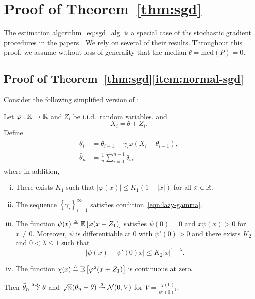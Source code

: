 \section{Proof of Theorem~\ref{thm:sgd}}
\label{proof:sgd}

\providecommand{\score}{\dot{\ell}}

The estimation algorithm~\eqref{eq:sgd_alg} is a special
case of the stochastic gradient procedures in the papers
\cite{PolyakJu92, polyak1990new}.
We rely on several of their results. Throughout this proof,
we assume without loss of generality that the median
$\theta = \mbox{med}(P) = 0$.

\subsection{Proof of Theorem~\ref{thm:sgd}\eqref{item:normal-sgd}}

Consider the following simplified version of
\cite[Thm. 4]{polyak1992acceleration}:
\begin{corollary}{\cite[Thms. 3 \& 4]{PolyakJu92}}
  \label{corollary:polyak-juditsky}
  Let $\varphi : \mathbb{R} \to \mathbb{R}$ and $Z_i$ be i.i.d.\ random
  variables, and
  \begin{equation*}
  X_i = \theta + Z_i.
  \end{equation*}
  Define
  \begin{align}
    \begin{split}
      \theta_i & = \theta_{i-1} + \gamma_i \varphi(X_i - \theta_{i-1}), \\
      \bar{\theta}_n & = \frac{1}{n} \sum_{i=0}^{n-1} \theta_i, 
    \end{split}
    \label{eq:Polyak_Juditsky_alg}
  \end{align}
  where in addition,
  \begin{enumerate}[(i)]
  \item There exists $K_1$ such that $\left| \varphi(x) \right| \leq
    K_1(1+|x|)$ for all $x\in \mathbb{R}$.
  \item The sequence $\left\{ \gamma_i \right\}_{i=1}^\infty$ satisfies
    condition~\eqref{eqn:lazy-gamma}.
  \item \label{item:zero-gradient}
    The function $\psi(x) \triangleq \mathbb{E}\left[  \varphi(x+Z_1)\right]$
    satisfies $\psi(0) = 0$ and
    $x\psi(x) > 0$ for $x\neq 0$.  Moreover, $\psi$ is differentiable
    at 0 with $\psi'(0) > 0$ and there exists
    $K_2$ and $0 < \lambda \leq 1$ such that
    \begin{equation}
      \label{eqn:local-hessian-psi}
        \left| \psi(x) - \psi'(0)x \right|\leq K_2 |x|^{1+\lambda}.
    \end{equation}
  \item The function 
    $\chi(x) \triangleq \mathbb{E}\left[ \varphi^2(x+Z_1)\right]$ is continuous at zero. 
  \end{enumerate}
  Then $\bar{\theta}_n \stackrel{a.s.}{\rightarrow} \theta$ and $ \sqrt{n}({\theta}_n - \theta)
  \stackrel{d}{\rightsquigarrow} \mathcal{N}(0,V)$ for
  $V = \frac{ \chi(0)} {\psi'(0)^2}$.
\end{corollary}

